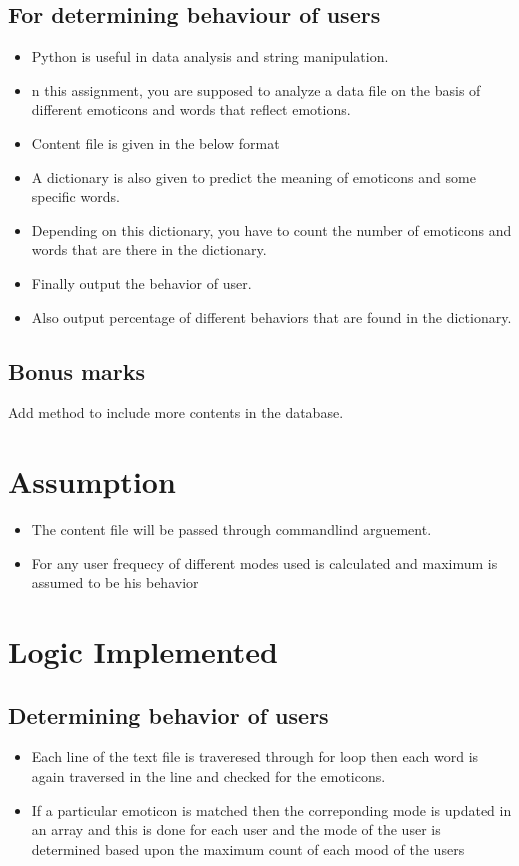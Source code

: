 \documentclass[a4paper,10pt]{report}
\begin{document}
\section{For determining behaviour of users}
\begin{itemize}
 \item Python is useful in data analysis and string manipulation. 
 \item n this assignment, you are supposed to analyze a data file on the basis of different 
emoticons and words that reflect emotions. 
\item Content file is given in the below format
\item A dictionary is also given to predict the meaning of emoticons and some specific
words.
\item Depending on this dictionary, you have to count the number of emoticons and words
that are there in the dictionary.
\item Finally output the behavior of user.
\item Also output percentage of different behaviors that are found in the dictionary.
\end{itemize}

\section{Bonus marks}
Add method to include more contents in the database.
\newpage
\chapter{Assumption}
\begin{itemize}
  \item The content file will be passed through commandlind arguement.
 \item For any user frequecy of different modes used is calculated and maximum is assumed to be his behavior
 
 
\end{itemize}
\newpage
\chapter{Logic Implemented}
\section{Determining behavior of users}
\begin{itemize}
 \item Each line of the text file is traveresed through for loop then each word is again traversed in the line and checked for the emoticons.
 \item If a particular emoticon is matched then the correponding mode is updated in an array and this is done for each user and the mode of the user is determined based upon the maximum count of each mood of the users
\end{itemize}
\end{document}
